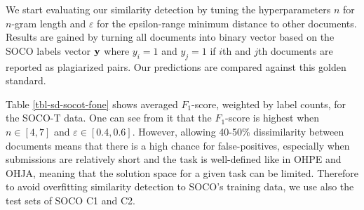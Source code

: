 
We start evaluating our similarity detection by tuning the hyperparameters $n$ for $n$-gram length and $\varepsilon$ for the epsilon-range \ie minimum distance to other documents. Results are gained by turning all documents into binary vector based on the SOCO labels \ie vector $\mathbf{y}$ where $y_i = 1$ and $y_j = 1$ if $i$th and $j$th documents are reported as plagiarized pairs. Our predictions are compared against this golden standard.

Table \ref{tbl-sd-socot-fone} shows averaged $F_1$-score, weighted by label counts, for the SOCO-T data. One can see from it that the $F_1$-score is highest when $n \in [4, 7]$ and $\varepsilon \in [0.4, 0.6]$. However, allowing 40-50\% dissimilarity between documents means that there is a high chance for false-positives, especially when submissions are relatively short and the task is well-defined like in OHPE and OHJA, meaning that the solution space for a given task can be limited. Therefore to avoid overfitting similarity detection to SOCO's training data, we use also the test sets of SOCO C1 and C2.   

\newpage

\begin{table}[ht]
\centering
\caption{Average $F_1$-score for $n$-gram length and $\varepsilon$-range for SOCO-T containing 115 cases of plagiarism. The smaller the $\varepsilon$-range is, the more similar documents have to be. $F_1$-scores close or over 0.8 are bolded.}
\label{tbl-sd-socot-fone}
\end{table}




